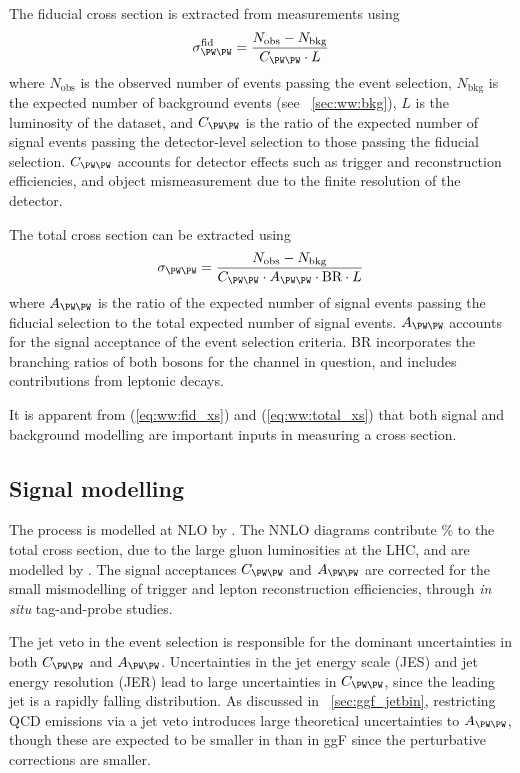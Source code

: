The fiducial cross section is extracted from measurements using
\begin{equation}
	\sigma_{\WW}^{\text{fid}} = \frac{N_{\text{obs}} - N_{\text{bkg}}}{C_{\WW} \cdot L}
	\label{eq:ww:fid_xs}
\end{equation}
where $N_{\text{obs}}$ is the observed number of events passing the event selection, 
$N_{\text{bkg}}$ is the expected number of background events (see 
\Section~\ref{sec:ww:bkg}), $L$ is the luminosity of the dataset, and $C_{\WW}$ is the 
ratio of the expected number of signal events passing the detector-level selection to 
those passing the fiducial selection. $C_{\WW}$ accounts for detector effects such as 
trigger and reconstruction efficiencies, and object mismeasurement due to the 
finite resolution of the detector.

The total cross section can be extracted using
\begin{equation}
	\sigma_{\WW} = \frac{N_{\text{obs}} - N_{\text{bkg}}}{C_{\WW} \cdot A_{\WW} \cdot \text{BR} \cdot L}
	\label{eq:ww:total_xs}
\end{equation}
where $A_{\WW}$ is the ratio of the expected number of signal events passing the fiducial 
selection to the total expected number of signal events. $A_{\WW}$ accounts for the 
signal acceptance of the event selection criteria. BR incorporates the branching ratios 
of both \PW bosons for the channel in question, and includes contributions from leptonic 
\Ptau decays.

It is apparent from (\ref{eq:ww:fid_xs}) and (\ref{eq:ww:total_xs}) that both signal and 
background modelling are important inputs in measuring a cross section.



\subsection{Signal modelling}
\label{sec:ww:signal}

The \WW process is modelled at NLO by \meps{\mcatnlo}{\fherwig}. The NNLO \ggWW diagrams 
contribute \% to the total cross section, due to the large gluon luminosities at 
the LHC, and are modelled by \meps{\ggtoww}{\fherwig} \cite{gg2ww}. The signal 
acceptances $C_{\WW}$ and $A_{\WW}$ are corrected for the small mismodelling of trigger and 
lepton reconstruction efficiencies, through \textit{in situ} tag-and-probe studies.

The jet veto in the event selection is responsible for the dominant uncertainties in both 
$C_{\WW}$ and $A_{\WW}$. Uncertainties in the jet energy scale (JES) and jet energy 
resolution (JER) lead to large uncertainties in $C_{\WW}$, since the leading jet \pt is a 
rapidly falling distribution. As discussed in \Section~\ref{sec:ggf_jetbin}, restricting 
QCD emissions via a jet veto introduces large theoretical uncertainties to $A_{\WW}$, 
though these are expected to be smaller in \WW than in ggF since the perturbative 
corrections are smaller.

